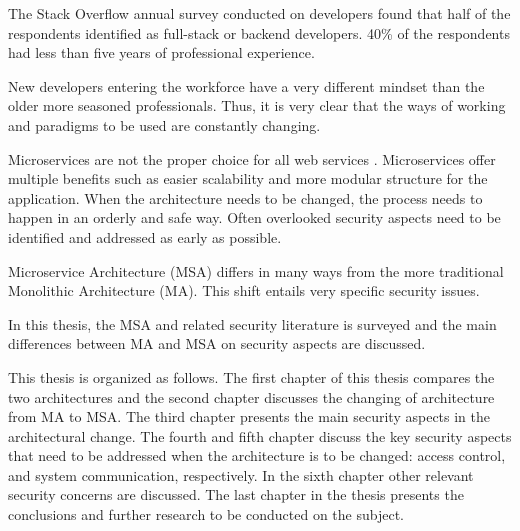 \begin{sloppypar}
    The Stack Overflow annual survey \citep{sosurvey2019} conducted on
    developers found that half of the respondents identified as full-stack or
    backend developers. 40\% of the respondents had less than five years of
    professional experience.
\end{sloppypar}
\begin{sloppypar}
    New developers entering the workforce have a very different mindset than 
    the older more seasoned professionals. Thus, it is very clear that the ways 
    of working and paradigms to be used are constantly changing.
\end{sloppypar}
\begin{sloppypar}
     Microservices are not the proper choice for all web services
     \citep{newman2019}. Microservices offer multiple benefits such as easier
     scalability and more modular structure for the application. When the
     architecture needs to be changed, the process needs to happen in an orderly
     and safe way. Often overlooked security aspects need to be identified and
     addressed as early as possible.
\end{sloppypar}
\begin{sloppypar}
    Microservice Architecture (MSA) differs in many ways from the more
    traditional Monolithic Architecture (MA). This shift entails very specific
    security issues.
\end{sloppypar}
\begin{sloppypar}
    In this thesis, the MSA and related security literature is surveyed and the
    main differences between MA and MSA on security aspects are discussed. 
\end{sloppypar}
\begin{sloppypar}
    This thesis is organized as follows. The first chapter of this thesis
    compares the two architectures and the second chapter discusses the changing
    of architecture from MA to MSA. The third chapter presents the main security
    aspects in the architectural change. The fourth and fifth chapter discuss
    the key security aspects that need to be addressed when the architecture is
    to be changed: access control, and system communication, respectively. In
    the sixth chapter other relevant security concerns are discussed. The last
    chapter in the thesis presents the conclusions and further research to be
    conducted on the subject.
\end{sloppypar}


